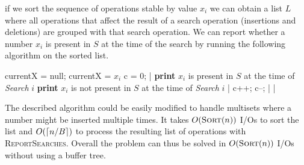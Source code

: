 if we sort the sequence of operations stable by value $x_i$ we can obtain a list $L$ where all operations that affect the result of a search operation (insertions and deletions) are grouped with that search operation. We can report whether a number $x_i$ is present in $S$ at the time of the search by running the following algorithm on the sorted list.
\begin{sourcecode}
currentX = null;
		currentX = $x_i$
		c = 0;
	|
			\textbf{print} $x_i$ is present in $S$ at the time of \textit{Search} $i$
		\qelse
			\textbf{print} $x_i$ is not present in $S$ at the time of \textit{Search} $i$
		|
	\qelse {}
		c++;
	\qelse {}
		c--; 
	|
|
\qend
\end{sourcecode}

The described algorithm could be easily modified to handle multisets where a number might be inserted multiple times. It takes $O(\textsc{Sort}(n))$ I/Os to sort the list and $O(\lceil n/B\rceil)$ to process the resulting list of operations with \textsc{ReportSearches}. Overall the problem can thus be solved in $O(\textsc{Sort}(n))$ I/Os without using a buffer tree.